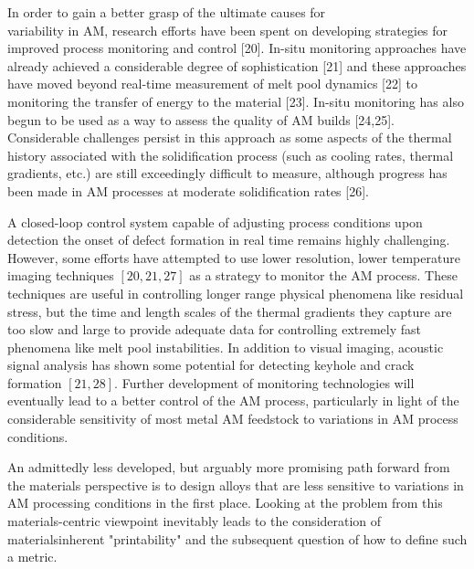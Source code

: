 \documentclass[10pt]{article}
\begin{document}
In order to gain a better grasp of the ultimate causes for\\
variability in AM, research efforts have been spent on developing strategies for improved process monitoring and control [20]. In-situ monitoring approaches have already achieved a considerable degree of sophistication [21] and these approaches have moved beyond real-time measurement of melt pool dynamics [22] to monitoring the transfer of energy to the material [23]. In-situ monitoring has also begun to be used as a way to assess the quality of AM builds [24,25]. Considerable challenges persist in this approach as some aspects of the thermal history associated with the solidification process (such as cooling rates, thermal gradients, etc.) are still exceedingly difficult to measure, although progress has been made in AM processes at moderate solidification rates [26].

A closed-loop control system capable of adjusting process conditions upon detection the onset of defect formation in real time remains highly challenging. However, some efforts have attempted to use lower resolution, lower temperature imaging techniques $[20,21,27]$ as a strategy to monitor the AM process. These techniques are useful in controlling longer range physical phenomena like residual stress, but the time and length scales of the thermal gradients they capture are too slow and large to provide adequate data for controlling extremely fast phenomena like melt pool instabilities. In addition to visual imaging, acoustic signal analysis has shown some potential for detecting keyhole and crack formation $[21,28]$. Further development of monitoring technologies will eventually lead to a better control of the AM process, particularly in light of the considerable sensitivity of most metal AM feedstock to variations in AM process conditions.

An admittedly less developed, but arguably more promising path forward from the materials perspective is to design alloys that are less sensitive to variations in AM processing conditions in the first place. Looking at the problem from this materials-centric viewpoint inevitably leads to the consideration of materialsinherent "printability" and the subsequent question of how to define such a metric.
\end{document}
